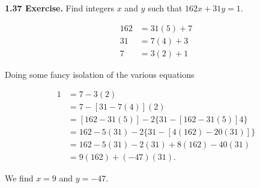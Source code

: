\documentclass[12pt]{article}
\begin{document}
\noindent\textbf{1.37 Exercise.} Find integers $x$ and $y$ such that $162x+31y=1$.

\begin{align*}
162 &= 31(5)+7 \\
31 &= 7(4)+3\\
7 &= 3(2)+1
\end{align*}

\noindent Doing some fancy isolation of the various equations

\begin{align*}
1 &= 7-3(2)\\
 &= 7 - [31-7(4)](2)\\
  &= [162-31(5)] - 2\{31-[162-31(5)]4\}\\
 &= 162-5(31) - 2\{31-[4(162)-20(31)]\}\\
  &= 162-5(31) - 2(31)+8(162)-40(31)\\
 &= 9(162)+(-47)(31).
\end{align*}

\noindent We find $x=9$ and $y=-47$.
\end{document}
